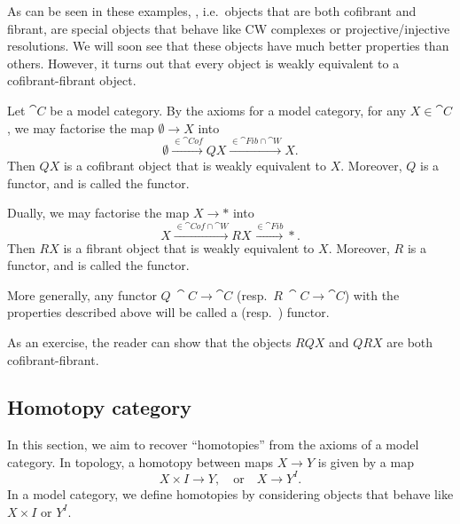 As can be seen in these examples, 
, i.e.\ objects that are both cofibrant and fibrant,
are special objects that
behave like CW complexes or projective/injective resolutions.
We will soon see that these objects
have much better properties than others.
However, it turns out that every object
is weakly equivalent to a cofibrant-fibrant object.

\begin{construction}
    Let $\cat C$ be a model category.
    By the axioms for a model category,
    for any $X\in\cat C$, we may factorise the map $\emptyset\to X$ into
    \[ \emptyset\xrightarrow{\in\cat{Cof}}QX\xrightarrow{\in\cat{Fib}\cap\cat{W}}X. \]
    Then $QX$ is a cofibrant object that is weakly equivalent to $X$.
    Moreover, $Q$ is a functor, and is called the  functor.

    Dually, we may factorise the map $X\to *$ into
    \[ X\xrightarrow{\in\cat{Cof\cap\cat W}}RX\xrightarrow{\in\cat{Fib}}*. \]
    Then $RX$ is a fibrant object that is weakly equivalent to $X$.
    Moreover, $R$ is a functor, and is called the  functor.

    More generally, any functor $Q\:\cat{C}\to\cat{C}$
    (resp.\ $R\:\cat{C}\to\cat{C}$) with the properties described above
    will be called a  (resp.\ ) functor.

    As an exercise,
    the reader can show that the objects $RQX$ and $QRX$ are both cofibrant-fibrant. \varqed
\end{construction}

\subsection{Homotopy category}

In this section, we aim to recover ``homotopies'' from the axioms of a model category.
In topology, a homotopy between maps $X\to Y$ is given by a map
\[ X\times I\to Y,\quad\text{or}\quad X\to Y^I. \]
In a model category, we define homotopies
by considering objects that behave like $X\times I$ or $Y^I$.

